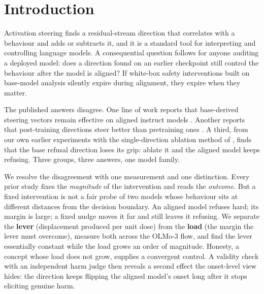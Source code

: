 \documentclass{article}
\begin{document}
\section{Introduction}
Activation steering finds a residual-stream direction that correlates with a behaviour and adds or
subtracts it, and it is a standard tool for interpreting and controlling language models. A
consequential question follows for anyone auditing a deployed model: does a direction found on an
earlier checkpoint still control the behaviour after the model is aligned? If white-box safety
interventions built on base-model analysis silently expire during alignment, they expire when they
matter.

The published answers disagree. One line of work reports that base-derived steering vectors remain
effective on aligned instruct models \citep{personavectors}. Another reports that post-training
directions steer better than pretraining ones \citep{olmoharmfulness}. A third, from our own
earlier experiments with the single-direction ablation method of \citet{arditi}, finds that the
base refusal direction loses its grip: ablate it and the aligned model keeps refusing. Three
groups, three answers, one model family.

We resolve the disagreement with one measurement and one distinction. Every prior study fixes the
\emph{magnitude} of the intervention and reads the \emph{outcome}. But a fixed intervention is not a
fair probe of two models whose behaviour sits at different distances from the decision boundary. An
aligned model refuses hard; its margin is large; a fixed nudge moves it far and still leaves it
refusing. We separate the \textbf{lever} (displacement produced per unit dose) from the
\textbf{load} (the margin the lever must overcome), measure both across the OLMo-3 flow, and find
the lever essentially constant while the load grows an order of magnitude. Honesty, a concept whose
load does not grow, supplies a convergent control. A validity check with an independent harm judge
then reveals a second effect the onset-level view hides: the direction keeps flipping the aligned
model's onset long after it stops eliciting genuine harm.
\end{document}
